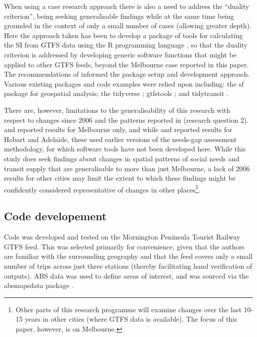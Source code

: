 \documentclass[preprint, 3p,
authoryear]{elsarticle} %
\begin{document}
When using a case research approach there is also a need to address the
``duality criterion'', being seeking generalisable findings while at the
same time being grounded in the context of only a small number of cases
(allowing greater depth)\citep{Denscombe2007aa, Ketokivi2014aa}. Here
the approach taken has been to develop a package of tools for
calculating the SI from GTFS data using the R programming language
\citep{R-base}, so that the duality criterion is addressed by developing
generic software functions that might be applied to other GTFS feeds,
beyond the Melbourne case reported in this paper. The recommendations of
\citet{wickham2023r} informed the package setup and development
approach. Various existing packages and code examples were relied upon
including: the sf package \citep{R-sf} for geospatial analysis; the
tidyverse \citep{tidyverse2019}; gtfstools \citep{R-gtfstools}; and
tidytransit \citep{R-tidytransit}.

There are, however, limitations to the generalisability of this research
with respect to changes since 2006 and the patterns reported in
\citet{currie2010identifying}(research question 2).
\citet{Currie2007Identifying} and \citet{currie2010identifying} reported
results for Melbourne only, and while \citet{Currie2003Hobart} and
\citet{Currie2004Gap} reported results for Hobart and Adelaide, these
used earlier versions of the needs-gap assessment methodology, for which
software tools have not been developed here. While this study does seek
findings about changes in spatial patterns of social needs and transit
supply that are generalisable to more than just Melbourne, a lack of
2006 results for other cities may limit the extent to which these
findings might be confidently considered representative of changes in
other places\footnote{Other parts of this research programme will
  examine changes over the last 10-15 years in other cities (where GTFS
  data is available). The focus of this paper, however, is on Melbourne.}.

\subsection{Code developement}\label{code-developement}

Code was developed and tested on the Mornington Peninsula Tourist
Railway GTFS feed. This was selected primarily for convenience, given
that the authors are familiar with the surrounding geography and that
the feed covers only a small number of trips across just three stations
(thereby facilitating hand verification of outputs). ABS data was used
to define areas of interest, and was sourced via the absmapsdata package
\citep{R-absmapsdata}.
\end{document}

